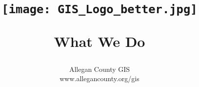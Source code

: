 \title{ %
\HRule %
\\[.4cm] %
\begin{figure}[H] %
\begin{center}	%
	\texttt{[image: GIS\_Logo\_better.jpg]}
	\end{center}
	\end{figure}
	\Huge \bfseries What We Do %
\HRule \\[.4cm] %
} %

\author{\Large Allegan County GIS \\\Large www.allegancounty.org/gis} %